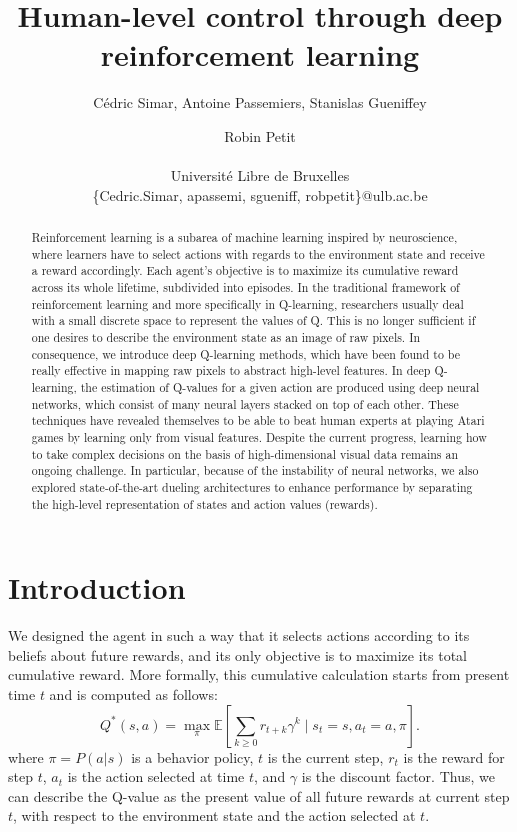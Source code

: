 \documentclass[letterpaper]{article}
\title{Human-level control through deep reinforcement learning}
\author{C\'{e}dric Simar, Antoine Passemiers, Stanislas Gueniffey \and Robin Petit \\
\mbox{}\\
Universit\'{e} Libre de Bruxelles \\
\{Cedric.Simar, apassemi, sgueniff, robpetit\}@ulb.ac.be}
\newcommand{\E}{\mathbb E}
\begin{document}
\maketitle

\begin{abstract}

  Reinforcement learning is a subarea of machine learning inspired by neuroscience, where learners have to select actions with
  regards to the environment state and receive a reward accordingly. Each agent's objective is to maximize its cumulative reward across its whole lifetime,
  subdivided into episodes. In the traditional framework of reinforcement learning and more specifically in Q-learning,
  researchers usually deal with a small discrete space to represent the values of Q. This is no longer sufficient if one desires to describe the environment state
  as an image of raw pixels. In consequence, we introduce deep Q-learning methods, which have been found to be really effective in mapping raw pixels
  to abstract high-level features. In deep Q-learning, the estimation of Q-values for a given action are produced using deep neural networks,
  which consist of many neural layers stacked on top of each other.
  These techniques have revealed themselves to be able to beat human experts at playing Atari games
  by learning only from visual features. Despite the current progress, learning how to take complex decisions on the basis of high-dimensional visual data remains an
  ongoing challenge. In particular, because of the instability of neural networks, we also explored state-of-the-art dueling architectures to enhance performance
  by separating the high-level representation of states and action values (rewards).

\end{abstract}

\section{Introduction}

We designed the agent in such a way that it selects actions according to its beliefs about future rewards, and its only objective is to maximize its total
cumulative reward. More formally, this cumulative calculation starts from present time $t$ and is computed as follows:
\[
  Q^{*}(s, a) = \max_{\pi} \E\left[ \sum_{k \geq 0}r_{t+k}\gamma^k \; \big| \; s_t = s, a_t = a, \pi\right].
\]
where $\pi = P(a | s)$ is a behavior policy, $t$ is the current step, $r_t$ is the reward for step $t$, $a_t$ is the action selected at time $t$,
and $\gamma$ is the discount factor. Thus, we can describe the Q-value as the present value of all future rewards at current step $t$,
with respect to the environment state and the action selected at $t$.
\end{document}
